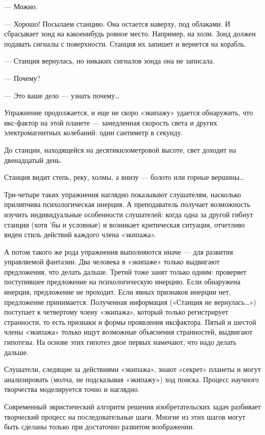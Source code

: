 — Можно.

—  Хорошо!  Посылаем  станцию.  Она  остается  наверху,  под  облаками.  И
сбрасывает зонд  на  какоенибудь ровное  место.  Например, на  холм.  Зонд
должен подавать сигналы с  поверхности. Станция их  запишет и вернется  на
корабль.

— Станция вернулась, но никаких сигналов зонда она не записала.

— Почему?

— Это ваше дело — узнать почему…

Упражнение продолжается, и еще не скоро «экипажу» удается обнаружить,  что
икс-фактор  на  этой  планете  —  замедленная  скорость  света  и   других
электромагнитных колебаний: один сантиметр в секунду.

До станции,  находящейся на  десятикилометровой  высоте, свет  доходит  на
двенадцатый день.

Станция видит степь, реку, холмы, а внизу — болото или горные вершины…

Три-четыре таких  упражнения  наглядно  показывают  слушателям,  насколько
прилипчива психологическая инерция.  А преподаватель получает  возможность
изучить индивидуальные особенности слушателей: когда одна за другой гибнут
станции (хотя 'бы и условные) и возникает критическая ситуация,  отчетливо
виден стиль действий каждого члена «экипажа».

А потом  такого  же  рода  упражнения выполняются  иначе  —  для  развития
управляемой  фантазии.   Два  человека   в  «экипаже»   только   выдвигают
предложения, что делать дальше. Третий тоже занят только одним:  проверяет
поступившее  предложение  на  психологическую  инерцию.  Если   обнаружена
инерция, предложение  не  проходит.  Если  явных  признаков  инерции  нет,
предложение принимается. Полученная  информация («Станция не  вернулась…»)
поступает  к  четвертому  члену  «экипажа»,  который  только  регистрирует
странности, то есть признаки и формы проявления иксфактора. Пятый и шестой
члены «экипажа» только  ищут возможные  объяснения странностей,  выдвигают
гипотезы. На основе  этих гипотез  двое первых намечают,  что надо  делать
дальше.

Слушатели, следящие  за действиями  «экипажа»,  знают «секрет»  планеты  и
могут анализировать (молча, не подсказывая «экипажу») ход поиска.  Процесс
научного творчества моделируется точно и наглядно.

Современный  эвристический   алгоритм   решения   изобретательских   задач
разбивает творческий  процесс на  последовательные  шаги. Многие  из  этих
шагов могут быть сделаны только при достаточно развитом воображении.

